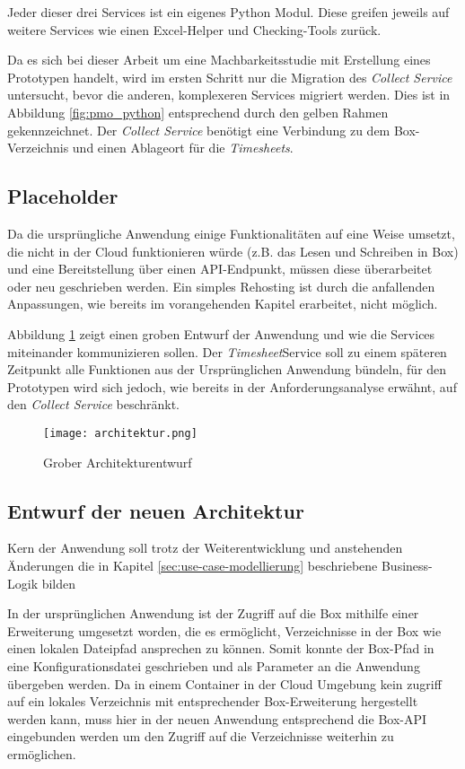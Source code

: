 Jeder dieser drei Services ist ein eigenes Python Modul. Diese greifen jeweils auf weitere Services wie einen Excel-Helper und Checking-Tools zurück.

Da es sich bei dieser Arbeit um eine Machbarkeitsstudie mit Erstellung eines Prototypen handelt, wird im ersten Schritt nur die Migration des \textit{Collect Service} untersucht, bevor die anderen, komplexeren Services migriert werden. Dies ist in Abbildung \ref{fig:pmo_python} entsprechend durch den gelben Rahmen gekennzeichnet. Der \textit{Collect Service} benötigt eine Verbindung zu dem \gls{Box}-Verzeichnis und einen Ablageort für die \grqq{} \textit{\glspl{Timesheet}}. \pagebreak

\subsection{Placeholder}
Da die ursprüngliche Anwendung einige Funktionalitäten auf eine Weise umsetzt, die nicht in der Cloud funktionieren würde (z.B. das Lesen und Schreiben in Box) und eine Bereitstellung über einen \ac{API}-Endpunkt, müssen diese überarbeitet oder neu geschrieben werden. Ein simples Rehosting ist durch die anfallenden Anpassungen, wie bereits im vorangehenden Kapitel erarbeitet, nicht möglich.

Abbildung \ref{fig:Architektur} zeigt einen groben  Entwurf der Anwendung und wie die Services miteinander kommunizieren sollen. Der \textit{\gls{Timesheet}}Service soll zu einem späteren Zeitpunkt alle Funktionen aus der Ursprünglichen Anwendung bündeln, für den Prototypen wird sich jedoch, wie bereits in der Anforderungsanalyse erwähnt, auf den \textit{Collect Service} beschränkt.

\begin{figure}[H]
    \centering
    \texttt{[image: architektur.png]}
    \caption{Grober Architekturentwurf}
    \label{fig:Architektur}
\end{figure}

\pagebreak

\subsection{Entwurf der neuen Architektur}
Kern der Anwendung soll trotz der Weiterentwicklung und anstehenden Änderungen die in Kapitel \ref{sec:use-case-modellierung} beschriebene Business-Logik bilden

In der ursprünglichen Anwendung ist der Zugriff auf die \gls{Box} mithilfe einer Erweiterung umgesetzt worden, die es ermöglicht, Verzeichnisse in der \gls{Box} wie einen lokalen Dateipfad ansprechen zu können. Somit konnte der Box-Pfad in eine Konfigurationsdatei geschrieben und als Parameter an die Anwendung übergeben werden. Da in einem Container in der Cloud Umgebung kein zugriff auf ein lokales Verzeichnis mit entsprechender \gls{Box}-Erweiterung hergestellt werden kann, muss hier in der neuen Anwendung entsprechend die \gls{Box}-\ac{API} eingebunden werden um den Zugriff auf die Verzeichnisse weiterhin zu ermöglichen.

